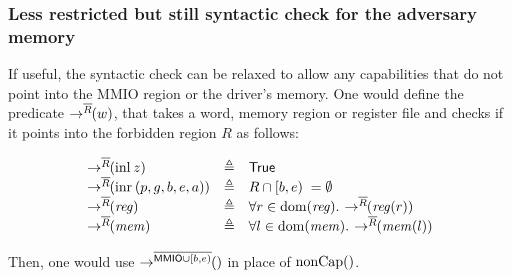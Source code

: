 \documentclass{article}
\newcommand{\X}[1]{\ensuremath{\mathrm{#1}}}
\newcommand{\V}[1]{\ensuremath{\mathit{#1}}}
\newcommand{\Sf}[1]{\ensuremath{\mathsf{#1}}}
\newcommand{\MMIO}{\Sf{MMIO}\xspace}
\begin{document}
\subsubsection{Less restricted but still syntactic check for the adversary memory}
\label{rk:toplevel:less_restricted_syntactic_check_adverary}

If useful, the syntactic check can be relaxed to allow any capabilities that
do not point into the MMIO region or the driver's memory. One would define the
predicate $\rightarrow^{\overline{R}}\!\!(w)$, that takes a word, memory region or register
file and checks if it points into the forbidden region $R$ as follows:

\[
  \begin{array}{lcl}
    \notMapsToR{R}{\X{inl}\spac z} & \eqdef
    & \TRUE \\
    \notMapsToR{R}{\X{inr}\spac (p,g,b,e,a)} & \eqdef & R \cap [b,e)\; =
                                                 \emptyset  \\
    \notMapsToR{R}{\V{reg}} & \eqdef & \forall r \in \dom(\V{reg}) \ldotp\spac \notMapsToR{R}{\V{reg}(r)} \\
    \notMapsToR{R}{\V{mem}} & \eqdef & \forall l \in \dom(\V{mem}) \ldotp\spac   \notMapsToR{R}{\V{mem}(l)}
  \end{array}
\]

Then, one would use $\notMapsToR{\MMIO \cup [b,e)}$ in place of $\mathrm{nonCap}()$.




\end{document}
